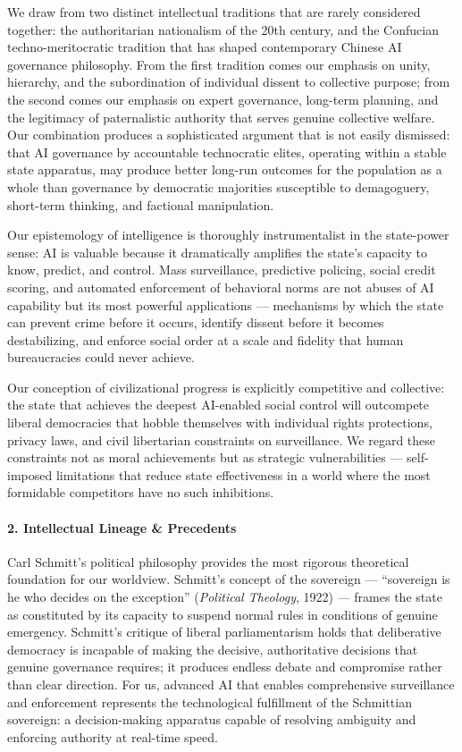 We draw from two distinct intellectual traditions that are rarely
considered together: the authoritarian nationalism of the 20th century,
and the Confucian techno-meritocratic tradition that has shaped
contemporary Chinese AI governance philosophy. From the first tradition
comes our emphasis on unity, hierarchy, and the subordination of
individual dissent to collective purpose; from the second comes our
emphasis on expert governance, long-term planning, and the legitimacy of
paternalistic authority that serves genuine collective welfare. Our
combination produces a sophisticated argument that is not easily
dismissed: that AI governance by accountable technocratic elites,
operating within a stable state apparatus, may produce better long-run
outcomes for the population as a whole than governance by democratic
majorities susceptible to demagoguery, short-term thinking, and
factional manipulation.

Our epistemology of intelligence is thoroughly instrumentalist in the
state-power sense: AI is valuable because it dramatically amplifies the
state's capacity to know, predict, and control. Mass surveillance,
predictive policing, social credit scoring, and automated enforcement of
behavioral norms are not abuses of AI capability but its most powerful
applications --- mechanisms by which the state can prevent crime before
it occurs, identify dissent before it becomes destabilizing, and enforce
social order at a scale and fidelity that human bureaucracies could
never achieve.

Our conception of civilizational progress is explicitly competitive and
collective: the state that achieves the deepest AI-enabled social
control will outcompete liberal democracies that hobble themselves with
individual rights protections, privacy laws, and civil libertarian
constraints on surveillance. We regard these constraints not as moral
achievements but as strategic vulnerabilities --- self-imposed
limitations that reduce state effectiveness in a world where the most
formidable competitors have no such inhibitions.

\paragraph{2. Intellectual Lineage \&
Precedents}\label{intellectual-lineage-precedents-22}

Carl Schmitt's political philosophy provides the most rigorous
theoretical foundation for our worldview. Schmitt's concept of the
sovereign --- ``sovereign is he who decides on the exception''
(\emph{Political Theology}, 1922) --- frames the state as constituted by
its capacity to suspend normal rules in conditions of genuine emergency.
Schmitt's critique of liberal parliamentarism holds that deliberative
democracy is incapable of making the decisive, authoritative decisions
that genuine governance requires; it produces endless debate and
compromise rather than clear direction. For us, advanced AI that enables
comprehensive surveillance and enforcement represents the technological
fulfillment of the Schmittian sovereign: a decision-making apparatus
capable of resolving ambiguity and enforcing authority at real-time
speed.

